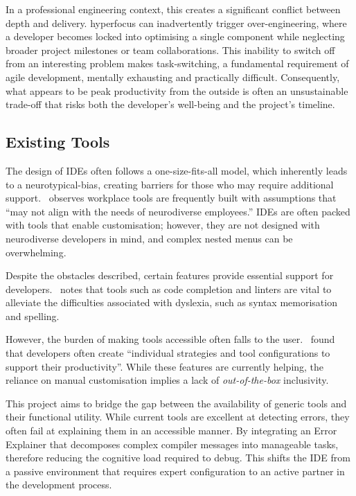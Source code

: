 In a professional engineering context, this creates a significant conflict between depth and delivery. \Gls{hyperfocus} can inadvertently trigger over-engineering, 
where a developer becomes locked into optimising a single component while neglecting broader project milestones or team collaborations. This inability to switch 
off from an interesting problem makes task-switching, a fundamental requirement of agile development, mentally exhausting and practically difficult. Consequently, 
what appears to be peak productivity from the outside is often an unsustainable trade-off that risks both the developer's well-being and the project's timeline.

\subsection{Existing Tools}
The design of \glspl{IDE} often follows a one-size-fits-all model, which inherently leads to a \gls{neurotypical-bias}, creating barriers for those who may 
require additional support.~\textcite{morris2015understanding} observes workplace tools are frequently built with assumptions that ``may not align with 
the needs of \gls{neurodiverse} employees.'' \glspl{IDE} are often packed with tools that enable customisation; however, they are not designed with \gls{neurodiverse} 
developers in mind, and complex nested menus can be overwhelming.

Despite the obstacles described, certain features provide essential support for developers.~\textcite{morris2015understanding} notes that tools such as code 
completion and linters are vital to alleviate the difficulties associated with \gls{dyslexia}, such as syntax memorisation and spelling.

However, the burden of making tools accessible often falls to the user.~\textcite{liebel2024challenges} found that developers often create ``individual
 strategies and tool configurations to support their productivity''. While these features are currently helping, the reliance on manual customisation 
 implies a lack of \textit{out-of-the-box} inclusivity.

This project aims to bridge the gap between the availability of generic tools and their functional utility. While current tools are excellent at
 detecting errors, they often fail at explaining them in an accessible manner. By integrating an Error Explainer that decomposes complex compiler 
 messages into manageable tasks, therefore reducing the cognitive load required to debug. This shifts the \gls{IDE} from a passive environment that 
 requires expert configuration to an active partner in the development process.


